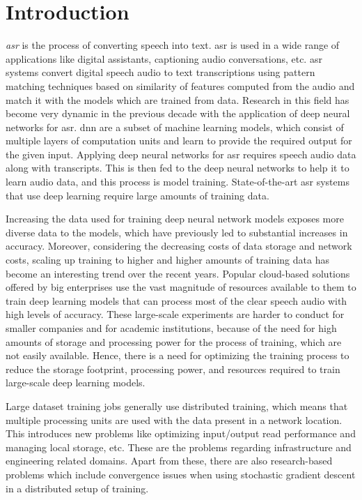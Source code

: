 \chapter{Introduction}
\label{chapter:intro}
\emph{\acrfull{asr}} is the process of converting speech into text. \acrshort{asr} is used in a wide range of applications like digital assistants,  captioning audio conversations, etc. \acrshort{asr} systems convert digital speech audio to text transcriptions using pattern matching techniques based on similarity of features computed from the audio and match it with the models which are trained from data. Research in this field has become very dynamic in the previous decade with the application of deep neural networks for \acrshort{asr}. \acrfull{dnn} are a subset of machine learning models, which consist of multiple layers of computation units and learn to provide the required output for the given input. Applying deep neural networks for \acrshort{asr} requires speech audio data along with transcripts. This is then fed to the deep neural networks to help it to learn audio data, and this process is model training. State-of-the-art \acrshort{asr} systems that use deep learning require large amounts of training data. 

Increasing the data used for training deep neural network models exposes more diverse data to the models, which have previously led to substantial increases in accuracy. Moreover, considering the decreasing costs of data storage and network costs\cite{Sayed2014ASecurity}, scaling up training to higher and higher amounts of training data has become an interesting trend over the recent years. Popular cloud-based solutions offered by big enterprises use the vast magnitude of resources available to them to train deep learning models that can process most of the clear speech audio with high levels of accuracy\cite{Li2020OnRecognition}. These large-scale experiments are harder to conduct for smaller companies and for academic institutions, because of the need for high amounts of storage and processing power for the process of training, which are not easily available. Hence, there is a need for optimizing the training process to reduce the storage footprint, processing power, and resources required to train large-scale deep learning models.

Large dataset training jobs generally use distributed training, which means that multiple processing units are used with the data present in a network location. This introduces new problems like optimizing input/output read performance and managing local storage, etc. These are the problems regarding infrastructure and engineering related domains. Apart from these, there are also research-based problems which include convergence issues when using stochastic gradient descent in a distributed setup of training.  

